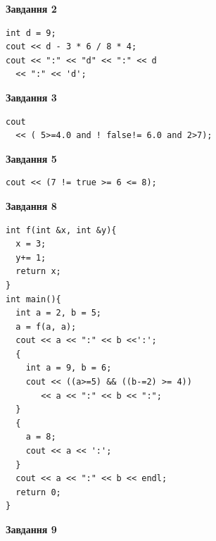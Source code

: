 \documentclass[12pt, ukrainian]{article}
\begin{document}
{\begin {large}
\begin{minipage}[t]{7.0cm}
\end{minipage}
\vline \hspace{1mm}
\begin{minipage}[t]{11.0cm}

\begin{center}
\textbf{Завдання 2}
\end{center}
\vspace{-8mm}

\begin{verbatim}
int d = 9;
cout << d - 3 * 6 / 8 * 4;
cout << ":" << "d" << ":" << d 
  << ":" << 'd';
\end{verbatim}



\begin{center}
\textbf{Завдання 3}
\end{center}
\vspace{-8mm}

\begin{verbatim}
cout 
  << ( 5>=4.0 and ! false!= 6.0 and 2>7);
\end{verbatim}



\begin{center}
\textbf{Завдання 5}
\end{center}
\vspace{-8mm}

\begin{verbatim}
cout << (7 != true >= 6 <= 8);
\end{verbatim}



\begin{center}
\textbf{Завдання 8}
\end{center}
\vspace{-8mm}

\begin{verbatim}
int f(int &x, int &y){
  x = 3;
  y+= 1;
  return x;
}
int main(){
  int a = 2, b = 5;
  a = f(a, a);
  cout << a << ":" << b <<':';
  {
    int a = 9, b = 6;
    cout << ((a>=5) && ((b-=2) >= 4))
       << a << ":" << b << ":";
  }
  {
    a = 8;
    cout << a << ':';
  }
  cout << a << ":" << b << endl;
  return 0;
}
\end{verbatim}

\end{minipage}


\begin{minipage}[t]{7.0cm}

\begin{center}
\textbf{Завдання 9}
\end{center}
\vspace{-8mm}


\end{minipage}
\end{large}}
\end{document}
